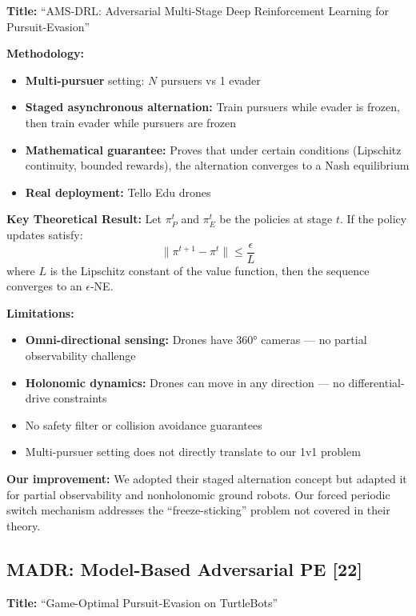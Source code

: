 \documentclass[11pt,a4paper]{report}
\begin{document}
\textbf{Title:} ``AMS-DRL: Adversarial Multi-Stage Deep Reinforcement Learning for Pursuit-Evasion''

\textbf{Methodology:}
\begin{itemize}
    \item \textbf{Multi-pursuer} setting: $N$ pursuers vs 1 evader
    \item \textbf{Staged asynchronous alternation:} Train pursuers while evader is frozen, then train evader while pursuers are frozen
    \item \textbf{Mathematical guarantee:} Proves that under certain conditions (Lipschitz continuity, bounded rewards), the alternation converges to a Nash equilibrium
    \item \textbf{Real deployment:} Tello Edu drones
\end{itemize}

\textbf{Key Theoretical Result:}
Let $\pi_P^t$ and $\pi_E^t$ be the policies at stage $t$. If the policy updates satisfy:
\begin{equation}
    \|\pi^{t+1} - \pi^t\| \leq \frac{\epsilon}{L}
\end{equation}
where $L$ is the Lipschitz constant of the value function, then the sequence converges to an $\epsilon$-NE.

\textbf{Limitations:}
\begin{itemize}
    \item \textbf{Omni-directional sensing:} Drones have 360° cameras --- no partial observability challenge
    \item \textbf{Holonomic dynamics:} Drones can move in any direction --- no differential-drive constraints
    \item No safety filter or collision avoidance guarantees
    \item Multi-pursuer setting does not directly translate to our 1v1 problem
\end{itemize}

\textbf{Our improvement:} We adopted their staged alternation concept but adapted it for partial observability and nonholonomic ground robots. Our forced periodic switch mechanism addresses the ``freeze-sticking'' problem not covered in their theory.

\subsection{MADR: Model-Based Adversarial PE [22]}

\textbf{Title:} ``Game-Optimal Pursuit-Evasion on TurtleBots''
\end{document}
